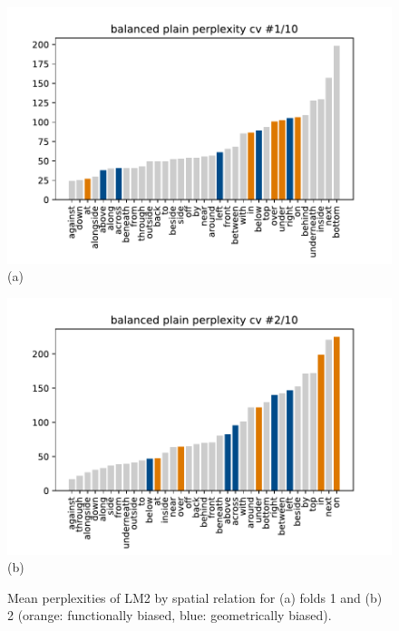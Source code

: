 \begin{figure}[ht!]
  \centering
  \begin{minipage}{.5\textwidth}
    \centering
    \hspace*{-1.2em}\includegraphics[width=1.12\columnwidth]{studies/splu2018/figures/b_pp_cv-f1.pdf} \\
    (a)
  \end{minipage}%
  \begin{minipage}{.5\textwidth}
    \centering
    \hspace*{-1.em}\includegraphics[width=1.12\columnwidth]{studies/splu2018/figures/b_pp_cv-f2.pdf} \\
    (b)
  \end{minipage}
  \caption{Mean perplexities of LM2 by spatial relation for (a) folds 1 and (b) 2 (orange:
    functionally biased, blue: geometrically biased).}\label{splu2018:fig:fig-plain-balanced-folds}
\end{figure}


\clearpage


